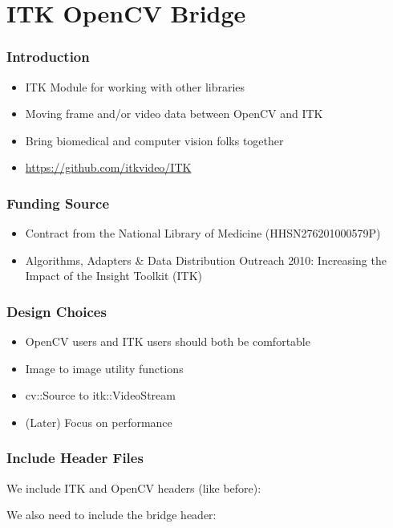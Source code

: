 \section{ITK OpenCV Bridge}



\begin{frame}
\frametitle{Introduction}
\begin{itemize}
\item ITK Module for working with other libraries
\item Moving frame and/or video data between OpenCV and ITK
\item Bring biomedical and computer vision folks together
\item \url{https://github.com/itkvideo/ITK}
\end{itemize}
\end{frame}

\begin{frame}
\frametitle{Funding Source}
\begin{itemize}
\item Contract from the National Library of Medicine (HHSN276201000579P)
\item Algorithms, Adapters \& Data Distribution Outreach 2010: Increasing the Impact of the Insight Toolkit (ITK)
\end{itemize}
\end{frame}

\begin{frame}
\frametitle{Design Choices}
\begin{itemize}
\item OpenCV users and ITK users should both be comfortable
\item Image to image utility functions
\item cv::Source to itk::VideoStream
\item (Later) Focus on performance
\end{itemize}
\end{frame}



\begin{frame}
\frametitle{Include Header Files}
\begin{center}
We include ITK and OpenCV headers (like before):


\vspace{1 em}
We also need to include the bridge header:

\end{center}
\end{frame}


